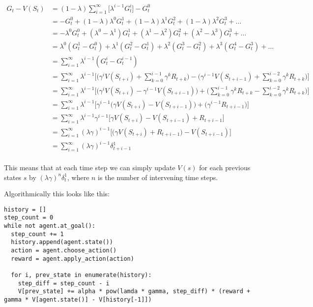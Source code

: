 \documentclass[11pt]{article}
\begin{document}
\begin{align*}
G_t - V(S_t) &= (1-\lambda)\sum_{i=1}^\infty \big[\lambda^{i-1} G^i_t \big] - G^0_t \\
&= -G^0_t + (1 - \lambda)\lambda^0 G^1_t + (1 - \lambda)\lambda^1 G^2_t + (1 - \lambda)\lambda^2 G^3_t + \dots \\
&= -\lambda^0 G^0_t + (\lambda^0 - \lambda^1) G^1_t + (\lambda^1 - \lambda^2) G^2_t + (\lambda^2 - \lambda^3) G^3_t + \dots \\
&= \lambda^0(G^1_t - G^0_t) + \lambda^1(G^2_t - G^1_t) + \lambda^2(G^3_t - G^2_t) + \lambda^3(G^4_t - G^3_t) + \dots \\
&= \sum_{i=1}^\infty \lambda^{i-1}(G^i_t - G^{i-1}_t) \\
&= \sum_{i=1}^\infty \lambda^{i-1}\bigg[\big(\gamma^i V(S_{t+i}) + \sum_{k=0}^{i - 1} \gamma^k R_{t+k}\big) - \big(\gamma^{i-1} V(S_{t+i-1}) + \sum_{k=0}^{i - 2} \gamma^k R_{t+k}\big) \bigg] \\
&= \sum_{i=1}^\infty \lambda^{i-1}\bigg[\big(\gamma^i V(S_{t+i}) - \gamma^{i-1} V(S_{t+i-1}) \big) + \big(\sum_{k=0}^{i - 1} \gamma^k R_{t+k} - \sum_{k=0}^{i - 2} \gamma^k R_{t+k}\big) \bigg] \\
&= \sum_{i=1}^\infty \lambda^{i-1}\bigg[\gamma^{i-1}\big(\gamma V(S_{t+i}) - V(S_{t+i-1}) \big) + \big(\gamma^{i-1} R_{t + i - 1}\big) \bigg] \\
&= \sum_{i=1}^\infty \lambda^{i-1}\gamma^{i-1}\bigg[\gamma V(S_{t+i}) - V(S_{t+i-1}) + R_{t + i - 1} \bigg] \\
&= \sum_{i=1}^\infty (\lambda\gamma)^{i-1}\bigg[\big(\gamma V(S_{t+i}) + R_{t + i - 1}\big) - V(S_{t+i-1}) \bigg] \\
&= \sum_{i=1}^\infty (\lambda\gamma)^{i-1}\delta^1_{t + i - 1} \\
\end{align*}

This means that at each time step we can simply update $V(s)$ for each previous states $s$ by $(\lambda\gamma)^n\delta^1_t$,
where $n$ is the number of intervening time steps.

Algorithmically this looks like this:
\begin{verbatim}
history = []
step_count = 0
while not agent.at_goal():
  step_count += 1
  history.append(agent.state())
  action = agent.choose_action()
  reward = agent.apply_action(action)

  for i, prev_state in enumerate(history):
    step_diff = step_count - i
    V[prev_state] += alpha * pow(lamda * gamma, step_diff) * (reward + gamma * V[agent.state()] - V[history[-1]])
\end{verbatim}
\end{document}
